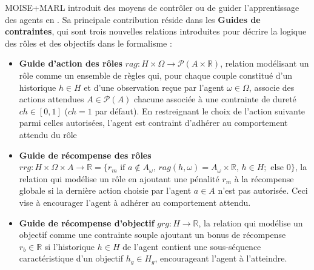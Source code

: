 \noindent MOISE+MARL introduit des moyens de contrôler ou de guider l'apprentissage des agents en . Sa principale contribution réside dans les \textbf{Guides de contraintes}, qui sont trois nouvelles relations introduites pour décrire la logique des rôles et des objectifs dans le formalisme  :
%
\begin{itemize}

    \item \textbf{Guide d'action des rôles} \quad $rag: H \times \Omega \rightarrow \mathcal{P}(A \times \mathbb{R})$, relation modélisant un rôle comme un ensemble de règles qui, pour chaque couple constitué d'un historique $h \in H$ et d'une observation reçue par l'agent $\omega \in \Omega$, associe des actions attendues $A \in \mathcal{P}(A)$ chacune associée à une contrainte de dureté $ch \in [0,1]$ ($ch = 1$ par défaut). En restreignant le choix de l'action suivante parmi celles autorisées, l'agent est contraint d'adhérer au comportement attendu du rôle
    \item \textbf{Guide de récompense des rôles} \quad $rrg: H \times \Omega \times A \to \mathbb{R} = \{r_m \text{ if } a \notin A_\omega \text{, } rag(h, \omega) \allowbreak = \allowbreak A_\omega \times \mathbb{R} \text{, } h \in H; \text{ else } 0\}$, la relation qui modélise un rôle en ajoutant une pénalité $r_m$ à la récompense globale si la dernière action choisie par l'agent $a \in A$ n'est pas autorisée. Ceci vise à encourager l'agent à adhérer au comportement attendu.
    \item \textbf{Guide de récompense d'objectif} \quad $grg: H \rightarrow \mathbb{R}$, la relation qui modélise un objectif comme une contrainte souple ajoutant un bonus de récompense $r_b \in \mathbb{R}$ si l'historique $h \in H$ de l'agent contient une sous-séquence caractéristique d'un objectif $h_g \in H_g$, encourageant l'agent à l'atteindre.
\end{itemize}

